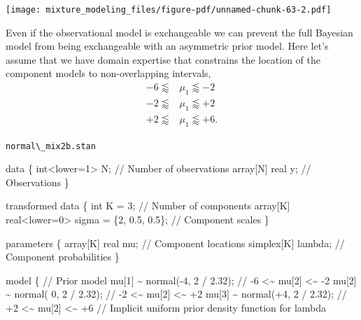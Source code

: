 \documentclass[
  letterpaper,
  DIV=11,
  numbers=noendperiod]{scrartcl}
\newenvironment{Shaded}{\begin{snugshade}}{\end{snugshade}}
\newcommand{\CommentTok}[1]{\textcolor[rgb]{0.37,0.37,0.37}{#1}}
\newcommand{\DataTypeTok}[1]{\textcolor[rgb]{0.68,0.00,0.00}{#1}}
\newcommand{\DecValTok}[1]{\textcolor[rgb]{0.68,0.00,0.00}{#1}}
\newcommand{\FloatTok}[1]{\textcolor[rgb]{0.68,0.00,0.00}{#1}}
\newcommand{\KeywordTok}[1]{\textcolor[rgb]{0.00,0.23,0.31}{#1}}
\newcommand{\NormalTok}[1]{\textcolor[rgb]{0.00,0.23,0.31}{#1}}
\begin{document}
\texttt{[image: mixture\_modeling\_files/figure-pdf/unnamed-chunk-63-2.pdf]}

Even if the observational model is exchangeable we can prevent the full
Bayesian model from being exchangeable with an asymmetric prior model.
Here let's assume that we have domain expertise that constrains the
location of the component models to non-overlapping intervals,
\begin{align*}
-6 \lessapprox &\mu_{1} \lessapprox -2
\\
-2 \lessapprox &\mu_{1} \lessapprox +2
\\
+2 \lessapprox &\mu_{1} \lessapprox +6.
\end{align*}

\begin{codelisting}

\caption{\texttt{normal\textbackslash\_mix2b.stan}}

\begin{Shaded}
\begin{Highlighting}[]
\KeywordTok{data}\NormalTok{ \{}
  \DataTypeTok{int}\NormalTok{\textless{}}\KeywordTok{lower}\NormalTok{=}\DecValTok{1}\NormalTok{\textgreater{} N;  }\CommentTok{// Number of observations}
  \DataTypeTok{array}\NormalTok{[N] }\DataTypeTok{real}\NormalTok{ y; }\CommentTok{// Observations}
\NormalTok{\}}

\KeywordTok{transformed data}\NormalTok{ \{}
  \DataTypeTok{int}\NormalTok{ K = }\DecValTok{3}\NormalTok{;                                    }\CommentTok{// Number of components}
  \DataTypeTok{array}\NormalTok{[K] }\DataTypeTok{real}\NormalTok{\textless{}}\KeywordTok{lower}\NormalTok{=}\DecValTok{0}\NormalTok{\textgreater{} sigma = \{}\DecValTok{2}\NormalTok{, }\FloatTok{0.5}\NormalTok{, }\FloatTok{0.5}\NormalTok{\}; }\CommentTok{// Component scales}
\NormalTok{\}}

\KeywordTok{parameters}\NormalTok{ \{}
  \DataTypeTok{array}\NormalTok{[K] }\DataTypeTok{real}\NormalTok{ mu;  }\CommentTok{// Component locations}
  \DataTypeTok{simplex}\NormalTok{[K] lambda; }\CommentTok{// Component probabilities}
\NormalTok{\}}

\KeywordTok{model}\NormalTok{ \{}
  \CommentTok{// Prior model}
\NormalTok{  mu[}\DecValTok{1}\NormalTok{] \textasciitilde{} normal({-}}\DecValTok{4}\NormalTok{, }\DecValTok{2}\NormalTok{ / }\FloatTok{2.32}\NormalTok{); }\CommentTok{// {-}6 \textless{}\textasciitilde{} mu[2] \textless{}\textasciitilde{} {-}2}
\NormalTok{  mu[}\DecValTok{2}\NormalTok{] \textasciitilde{} normal( }\DecValTok{0}\NormalTok{, }\DecValTok{2}\NormalTok{ / }\FloatTok{2.32}\NormalTok{); }\CommentTok{// {-}2 \textless{}\textasciitilde{} mu[2] \textless{}\textasciitilde{} +2}
\NormalTok{  mu[}\DecValTok{3}\NormalTok{] \textasciitilde{} normal(+}\DecValTok{4}\NormalTok{, }\DecValTok{2}\NormalTok{ / }\FloatTok{2.32}\NormalTok{); }\CommentTok{// +2 \textless{}\textasciitilde{} mu[2] \textless{}\textasciitilde{} +6}
  \CommentTok{// Implicit uniform prior density function for lambda}


\end{Highlighting}
\end{Shaded}
\end{codelisting}
\end{document}
